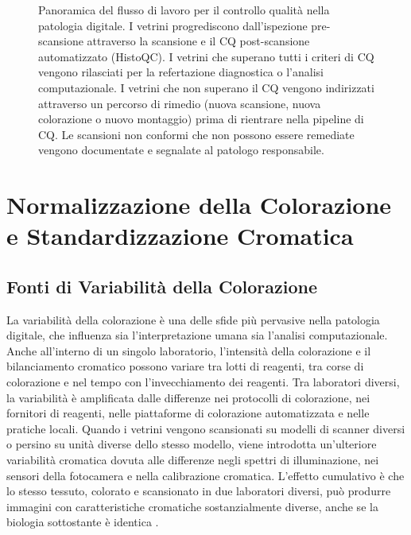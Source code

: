 \begin{figure}[htbp]
    \centering
    
    \caption{Panoramica del flusso di lavoro per il controllo qualità nella patologia digitale.
    I vetrini progrediscono dall'ispezione pre-scansione attraverso la scansione e il CQ
    post-scansione automatizzato (HistoQC). I vetrini che superano tutti i criteri di CQ vengono
    rilasciati per la refertazione diagnostica o l'analisi computazionale. I vetrini che non
    superano il CQ vengono indirizzati attraverso un percorso di rimedio (nuova scansione, nuova
    colorazione o nuovo montaggio) prima di rientrare nella pipeline di CQ. Le scansioni non
    conformi che non possono essere remediate vengono documentate e segnalate al patologo
    responsabile.}
    \label{fig:qc_workflow}
\end{figure}

\section{Normalizzazione della Colorazione e Standardizzazione Cromatica}
\label{sec:ch2-normalisation}

\subsection{Fonti di Variabilità della Colorazione}

La variabilità della colorazione è una delle sfide più pervasive nella patologia digitale, che
influenza sia l'interpretazione umana sia l'analisi computazionale. Anche all'interno di un
singolo laboratorio, l'intensità della colorazione e il bilanciamento cromatico possono variare
tra lotti di reagenti, tra corse di colorazione e nel tempo con l'invecchiamento dei reagenti.
Tra laboratori diversi, la variabilità è amplificata dalle differenze nei protocolli di
colorazione, nei fornitori di reagenti, nelle piattaforme di colorazione automatizzata e nelle
pratiche locali. Quando i vetrini vengono scansionati su modelli di scanner diversi o persino su
unità diverse dello stesso modello, viene introdotta un'ulteriore variabilità cromatica dovuta
alle differenze negli spettri di illuminazione, nei sensori della fotocamera e nella calibrazione
cromatica. L'effetto cumulativo è che lo stesso tessuto, colorato e scansionato in due laboratori
diversi, può produrre immagini con caratteristiche cromatiche sostanzialmente diverse, anche se
la biologia sottostante è identica \cite{tellez2019}.

